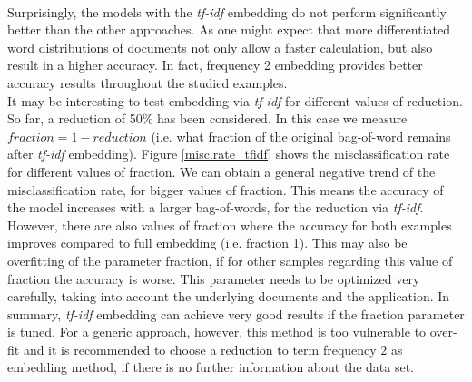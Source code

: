 \documentclass[11pt,a4paper]{article}
\begin{document}
\ \\
Surprisingly, the models with the \textit{tf-idf} embedding do not perform significantly better than the other approaches. As one might expect that more differentiated word distributions of documents not only allow a faster calculation, but also result in a higher accuracy. In fact, frequency 2 embedding provides better accuracy results throughout the studied examples.\\
It may be interesting to test embedding via \textit{tf-idf} for different values of reduction. So far, a reduction of 50\% has been considered. In this case we measure $\textit{fraction}=1-\textit{reduction}$ (i.e. what fraction of the original bag-of-word remains after \textit{tf-idf} embedding). Figure \ref{misc.rate_tfidf} shows the misclassification rate for different values of fraction. We can obtain a general negative trend of the misclassification rate, for bigger values of fraction. This means the accuracy of the model increases with a larger bag-of-words, for the reduction via \textit{tf-idf}. However, there are also values of fraction where the accuracy for both examples improves compared to full embedding (i.e. fraction 1). This may also be overfitting of the parameter fraction, if for other samples regarding this value of fraction the accuracy is worse. This parameter needs to be optimized very carefully, taking into account the underlying documents and the application. In summary, \textit{tf-idf} embedding can achieve very good results if the fraction parameter is tuned. For a generic approach, however, this method is too vulnerable to over-fit and it is recommended to choose a reduction to term frequency $2$ as embedding method, if there is no further information about the data set.\\
\end{document}
